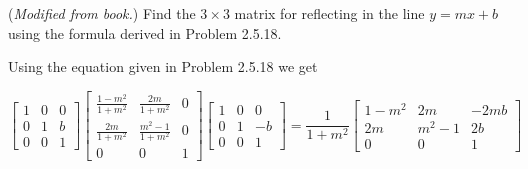\documentclass[../main.tex]{subfiles}
\begin{document}
(\emph{Modified from book.})
Find the $3\times3$ matrix for reflecting in the line $y = mx + b$ using the formula derived in Problem 2.5.18.

\solution

Using the equation given in Problem 2.5.18 we get

\[ \begin{bmatrix}
      1&0&0\\
      0&1&b\\
      0&0&1
    \end{bmatrix}
    \begin{bmatrix}
      \frac{1-m^2}{1+m^2}&\frac{2m}{1+m^2}&0\\
      \frac{2m}{1+m^2}&\frac{m^2-1}{1+m^2}&0\\
      0&0&1
    \end{bmatrix}
    \begin{bmatrix}
      1&0&0\\
      0&1&-b\\
      0&0&1
    \end{bmatrix}
    =
    \frac{1}{1+m^2}
    \begin{bmatrix}
      1-m^2 & 2m & -2mb\\
      2m & m^2-1 & 2b\\
      0&0&1
    \end{bmatrix}
\]
\end{document}

